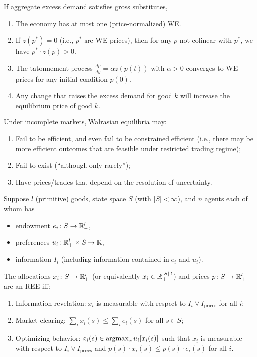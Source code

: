 \documentclass[8pt,letterpaper, landscape]{extarticle} %
\begin{document}
\begin{multicols}{3}
\begin{description}
If aggregate excess demand satisfies gross substitutes,
\begin{enumerate}
\item The economy has at most one (price-normalized) WE.
\item If $ z(p^*) = 0 $ (i.e., $ p^* $ are WE prices), then for any $ p $ not colinear with $ p^* $, we have $ p^* \cdot z(p) > 0 $.
\item The tatonnement process $ \frac{dp}{dy} = \alpha z(p(t)) $ with $ \alpha > 0 $ converges to WE prices for any initial condition $ p(0) $.
\item Any change that raises the excess demand for good $ k $ will increase the equilibrium price of good $ k $.
\end{enumerate}

 Under incomplete markets, Walrasian equilibria may:
\begin{enumerate}
\item Fail to be efficient, and even fail to be constrained efficient (i.e., there may be more efficient outcomes that are feasible under restricted trading regime);
\item Fail to exist (``although only rarely'');
\item Have prices/trades that depend on the resolution of uncertainty.
\end{enumerate}

 Suppose $ l $ (primitive) goods, state space $ S $ (with $ | S | < \infty $), and $ n $ agents each of whom has
\begin{itemize}
\item endowment $ e_i \colon S \to \mathbb{R}^l_+ $,
\item preferences $ u_i \colon \mathbb{R}^l_+ \times S \to \mathbb{R} $,
\item information $ I_i $ (including information contained in $ e_i $ and $ u_i $).
\end{itemize}
The allocations $ x_i \colon S \to \mathbb{R}^l_+ $ (or equivalently $ x_i \in \mathbb{R}^{\lvert S \rvert \cdot l}_+ $) and prices $ p \colon S \to \mathbb{R}^l_+ $ are an REE iff:
\begin{enumerate}
\item Information revelation: $ x_i $ is measurable with respect to $ I_i \vee I_{\text{prices}} $ for all $ i $;
\item Market clearing: $ \sum_{i} x_i (s) \leq \sum_i e_i(s) $ for all $ s \in S $;
\item Optimizing behavior: $ x_i (s) \in \operatorname*{argmax}_{x} u_i [x_i(s)] $ such that $ x_i $ is measurable with respect to $ I_i \vee I_{\text{prices}} $ and $ p(s) \cdot x_i (s) \leq p(s) \cdot e_i (s) $ for all $ i $.
\end{enumerate}


\end{description}
\end{multicols}
\end{document}
